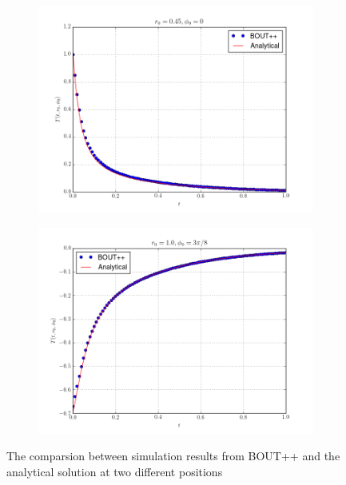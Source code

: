 \documentclass[11pt, oneside]{article}
\begin{document}
\begin{figure}
\centering
\begin{subfigure}{.5\textwidth}
  \centering
  \includegraphics[width=1.\linewidth]{pics/flux-cmpr-1.png}
  \caption{}
  \label{fig:sub11}
\end{subfigure}%
\begin{subfigure}{.5\textwidth}
  \centering
  \includegraphics[width=1.\linewidth]{pics/flux-cmpr-2.png}
  \caption{}
  \label{fig:sub12}
\end{subfigure}
\caption{The comparsion between simulation results from BOUT++ and the analytical solution at two different positions}
\label{fig2}
\end{figure}
\end{document}
